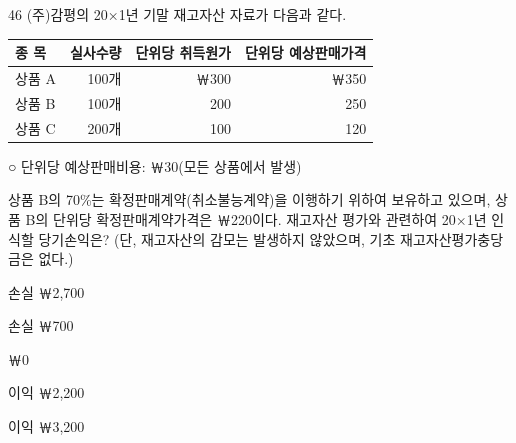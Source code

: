 \begin{question}{46}
(주)감평의 20×1년 기말 재고자산 자료가 다음과 같다.
\par{\small\centering\begin{tabular}{|l|r|r|r|}\hline
종 목 & 실사수량 & 단위당 취득원가 & 단위당 예상판매가격 \\ \hline
상품 A & 100개 & ￦300 & ￦350 \\
상품 B & 100개 & 200 & 250 \\
상품 C & 200개 & 100 & 120 \\ \hline
\end{tabular}\par}
\begin{framedtext}
○ 단위당 예상판매비용: ￦30(모든 상품에서 발생) \par
\end{framedtext}
상품 B의 70\%는 확정판매계약(취소불능계약)을 이행하기 위하여 보유하고 있으며, 상품 B의 단위당 확정판매계약가격은 ￦220이다. 재고자산 평가와 관련하여 20×1년 인식할 당기손익은? (단, 재고자산의 감모는 발생하지 않았으며, 기초 재고자산평가충당금은 없다.)
\begin{choices}
  \item 손실 ￦2,700
  \item 손실 ￦700
  \item ￦0
  \item 이익 ￦2,200
  \item 이익 ￦3,200
\end{choices}
\end{question}
